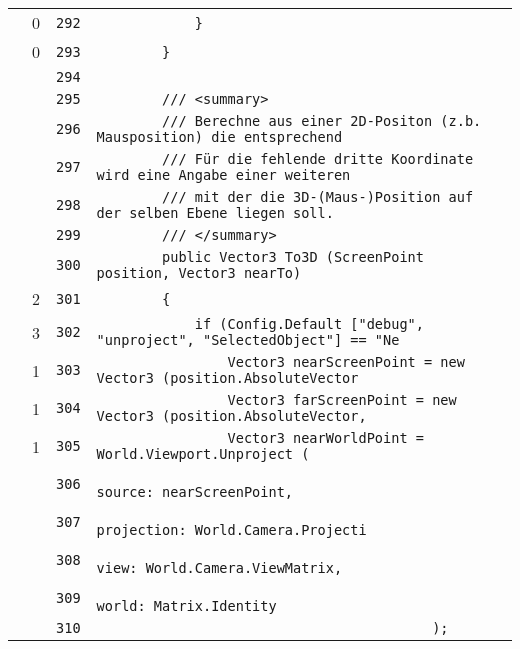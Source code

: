 \documentclass[a4paper,10pt]{article}
\begin{document}
\begin{longtable}[l]{lrrl}
\cellcolor{red} & 0 & \verb~292~ & \verb~            }~\\
\cellcolor{red} & 0 & \verb~293~ & \verb~        }~\\
\cellcolor{gray} &  & \verb~294~ & \verb~~\\
\cellcolor{gray} &  & \verb~295~ & \verb~        /// <summary>~\\
\cellcolor{gray} &  & \verb~296~ & \verb~        /// Berechne aus einer 2D-Positon (z.b. Mausposition) die entsprechend~\\
\cellcolor{gray} &  & \verb~297~ & \verb~        /// Für die fehlende dritte Koordinate wird eine Angabe einer weiteren~\\
\cellcolor{gray} &  & \verb~298~ & \verb~        /// mit der die 3D-(Maus-)Position auf der selben Ebene liegen soll.~\\
\cellcolor{gray} &  & \verb~299~ & \verb~        /// </summary>~\\
\cellcolor{gray} &  & \verb~300~ & \verb~        public Vector3 To3D (ScreenPoint position, Vector3 nearTo)~\\
\cellcolor{green} & 2 & \verb~301~ & \verb~        {~\\
\cellcolor{green} & 3 & \verb~302~ & \verb~            if (Config.Default ["debug", "unproject", "SelectedObject"] == "Ne~\\
\cellcolor{green} & 1 & \verb~303~ & \verb~                Vector3 nearScreenPoint = new Vector3 (position.AbsoluteVector~\\
\cellcolor{green} & 1 & \verb~304~ & \verb~                Vector3 farScreenPoint = new Vector3 (position.AbsoluteVector,~\\
\cellcolor{green} & 1 & \verb~305~ & \verb~                Vector3 nearWorldPoint = World.Viewport.Unproject (~\\
\cellcolor{gray} &  & \verb~306~ & \verb~                                             source: nearScreenPoint,~\\
\cellcolor{gray} &  & \verb~307~ & \verb~                                             projection: World.Camera.Projecti~\\
\cellcolor{gray} &  & \verb~308~ & \verb~                                             view: World.Camera.ViewMatrix,~\\
\cellcolor{gray} &  & \verb~309~ & \verb~                                             world: Matrix.Identity~\\
\cellcolor{gray} &  & \verb~310~ & \verb~                                         );~\\

\end{longtable}
\end{document}
